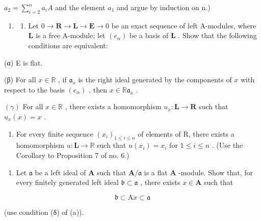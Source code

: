 \(a_{2}=\sum_{i=2}^{n}a_{i}A\) and the element \(a_{1}\) and argue by induction on n.)

\begin{enumerate}
\def\labelenumi{\arabic{enumi}.}
\setcounter{enumi}{22}
\tightlist
\item
  \begin{enumerate}
  \def\labelenumii{(\alph{enumii})}
  \tightlist
  \item
    Let \(0 \to \mathbf{R} \to \mathbf{L} \to \mathbf{E} \to 0\) be an exact sequence of left A-modules, where \(\mathbf{L}\) is a free A-module; let \((e_{\alpha})\) be a basis of \(\mathbf{L}\) . Show that the following conditions are equivalent:
  \end{enumerate}
\end{enumerate}

(α) E is flat.

(β) For all \(x \in \mathbb{R}\) , if \(\mathfrak{a}_x\) is the right ideal generated by the components of \(x\) with respect to the basis \((e_{\alpha})\) , then \(x \in \mathbb{R}\mathfrak{a}_x\) .

\((\gamma)\) For all \(x \in \mathbb{R}\) , there exists a homomorphism \(u_x: \mathbf{L} \to \mathbf{R}\) such that \(u_x(x) = x\) .

\begin{enumerate}
\def\labelenumi{(\arabic{enumi})}
\setcounter{enumi}{7}
\tightlist
\item
  For every finite sequence \((x_{i})_{1\leqslant i\leqslant n}\) of elements of R, there exists a homomorphism \(u\colon \mathbf{L}\to \mathbb{R}\) such that \(u(x_{i}) = x_{i}\) for \(1\leqslant i\leqslant n\) . (Use the Corollary to Proposition 7 of no. 6.)
\end{enumerate}

\begin{enumerate}
\def\labelenumi{(\alph{enumi})}
\setcounter{enumi}{1}
\tightlist
\item
  Let \(\mathfrak{a}\) be a left ideal of \(\mathbf{A}\) such that \(\mathbf{A} / \mathfrak{a}\) is a flat \(\mathbf{A}\) -module. Show that, for every finitely generated left ideal \(\mathfrak{b} \subset \mathfrak{a}\) , there exists \(x \in \mathbf{A}\) such that
\end{enumerate}

\[
\mathfrak {b} \subset \mathrm{A} x \subset \mathfrak {a}
\]

(use condition (δ) of (a)).

